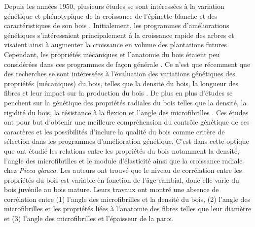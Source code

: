 \documentclass[a4paper,12pt]{report}
\begin{document}
Depuis les années 1950, plusieurs études se sont intéressées à la variation génétique et phénotypique de la croissance de l'épinette blanche et des caractéristiques de son bois \citep{Corriveau1971,Li1993,Li1997}. Initialement, les programmes d'améliorations génétiques s'intéressaient principalement à la croissance rapide des arbres et visaient ainsi à augmenter la croissance en volume des plantations futures. Cependant, les  propriétés mécaniques et l'anatomie du bois étaient peu considérées dans ces programmes de façon générale \citep{Zhang1995}. Ce n'est que récemment que des recherches se sont intéressées à l'évaluation des variations génétiques des propriétés (mécaniques) du bois, telles que la densité du bois, la longueur des fibres et leur impact sur la production du bois \citep{Hernandez2001,Beaulieu2003}. De plus en plus d'études se penchent sur la génétique des propriétés radiales du bois telles que la densité, la rigidité du bois, la résistance à la flexion et l'angle des microfibrilles \citep{Lenz2010,McLean2016}. Ces études ont pour but d'obtenir une meilleure compréhension du contrôle génétique de ces caractères et les possibilités d'inclure la qualité du bois comme critère de sélection dans les programmes d'amélioration génétique. C'est dans cette optique que \cite{Lenz2011} ont étudié les relations entre les propriétés du bois notamment la densité, l'angle des microfibrilles et le module d'élasticité ainsi que la croissance radiale chez \textit{Picea glauca}. Les auteurs ont trouvé que le niveau de corrélation entre les propriétés du bois est variable en fonction de l'âge cambial, donc elle varie du bois juvénile au bois mature. Leurs travaux ont montré une absence de corrélation entre (1) l'angle des microfibrilles et la densité du bois, (2) l'angle des microfibrilles et les propriétés liées à l'anatomie des fibres telles que leur diamètre et (3) l'angle des microfibrilles et l'épaisseur de la paroi. \\ 
\end{document}
